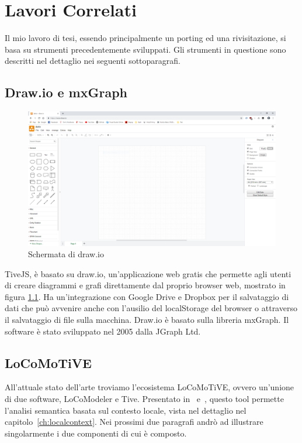 \chapter{Lavori Correlati}
    Il mio lavoro di tesi, essendo principalmente un porting ed una rivisitazione, si basa su strumenti precedentemente sviluppati.
    Gli strumenti in questione sono descritti nel dettaglio nei seguenti sottoparagrafi.

    \section{Draw.io e mxGraph}

        \begin{figure}[htbp]
            \centering
            \includegraphics[scale=0.17]{Figure/drawio.png}
            \caption{Schermata di draw.io}
            \label{fig:drawio}
        \end{figure}

        TiveJS, è basato su draw.io, un'applicazione web gratis che permette agli utenti di creare diagrammi e grafi direttamente dal proprio browser web, mostrato in figura \ref{fig:drawio}. Ha un'integrazione con Google Drive e Dropbox per il salvataggio di dati che può avvenire anche con l'ausilio del localStorage del browser o attraverso il salvataggio di file sulla macchina. Draw.io è basato sulla libreria mxGraph.
        \newline
        Il software è stato sviluppato nel 2005 dalla JGraph Ltd.

    \section{LoCoMoTiVE}
        
        All'attuale stato dell'arte troviamo l'ecosistema LoCoMoTiVE, ovvero un'unione di due software, LoCoModeler e Tive. Presentato in~\cite{extending_localcontext} e~\cite{localcontext}, questo tool permette l'analisi semantica basata sul contesto locale, vista nel dettaglio nel capitolo~\ref{ch:localcontext}. Nei prossimi due paragrafi andrò ad illustrare singolarmente i due componenti di cui è composto.

